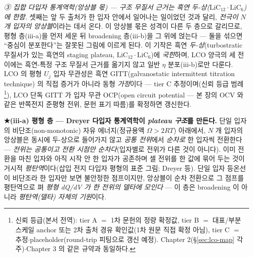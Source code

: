 \emph{③ 집합 다입자 통계역학(앙상블 몫) --- 구조 무질서 근거는 흑연 두-상($\mathrm{LiC_{12}}\cdot\mathrm{LiC_6}$)에 한함.} 셋째는 앞 두 출처가
한 입자 안에서 일어나는 일이었던 것과 달리, \emph{전극이 $N$ 개 입자의 앙상블}이라는 데서 온다. 이 앙상블 몫은 성격이
다른 두 층으로 갈리므로, 평형 층(iii-a)을 먼저 세운 뒤 broadening 층(iii-b)을 그 위에 얹는다 --- 둘을 섞으면 ``중심이
분포한다''는 잘못된 그림에 이르게 된다. 이 기작은 흑연 \emph{두-상}(turbostratic 무질서가 있는 흑연의 staging
plateau, $\mathrm{LiC_{12}}\cdot\mathrm{LiC_6}$)에 \emph{국한}하며, LCO 양극의 세 전이에는 흑연-특정 구조 무질서
근거를 옮기지 않고 일반 $\eta$ 분포(iii-b)로만 다룬다. LCO 의 평형 $U_j$ 입자 무관성은 흑연
GITT(galvanostatic intermittent titration technique)\cite{park2021} 의 직접 증거가 아니라 동형
\emph{가정}이다 --- tier C 추정이며(신뢰 등급 범례\footnote{신뢰 등급(본서 전역): tier A $=$ 1차 문헌의 정량 확정값, tier B $=$ 대표/부분 스케일 anchor 또는 2차 출처 경유 확인값(1차 원문 직접 확정 아님), tier C $=$ 추정$\cdot$placeholder(round-trip 피팅으로 갱신 예정). Chapter 2(\S\ref{sec:lco-map} 각주)$\cdot$Chapter 3 의 같은 규약과 동일하다.}), LCO 단독 GITT 가 입자
무관 OCP(open circuit potential --- 본 장의 OCV 와 같은 반쪽전지 준평형 전위, 문헌 표기 따름)를
확정하면 갱신한다.

\textbf{★(iii-a) 평형 층 --- Dreyer 다입자 통계역학이 \emph{plateau 구조}를 만든다.} 단일 입자의 비단조(non-monotonic) 자유
에너지(정규용액 $\Omega>2RT$) 아래에서, $N$ 개 입자의 앙상블은 동시에 두-상으로 들어가지 않고 \emph{공통 전위}에서
\emph{순차로} 한 입자씩 전환한다 --- \emph{전위는 공통이고 전환 시점만 순차다}(입자별로 전위가 다른 것이 아니다). 이미
전환을 마친 입자와 아직 시작 안 한 입자가 공존하며 셀 전위를 한 값에 묶어 두는
것이 거시적 \emph{평탄역}이다(삽입 전지 다입자 평형의 표준 그림; Dreyer 등\cite{dreyer2010,dreyer2011}).
단일 입자 등온선이 비단조라 한 입자만 보면 불안정한 점프이지만, 앙상블이 순차 전환으로 그 점프를
평탄역으로 펴 \emph{평형 dQ/dV 가 한 전위의 델타에 모인다} --- 이 층은 broadening 이 아니라 \emph{평탄역(델타) 자체의 기원}이다.

